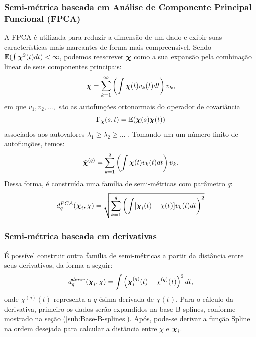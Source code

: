 \documentclass[
	12pt,				%
	openright,			%
	oneside,			%
	a4paper,			%
	english,			%
	brazil				%
	]{dissertacao-ufrgs-abntex2}
\begin{document}
\subsubsection*{Semi-métrica baseada em Análise de Componente Principal Funcional
(FPCA)}

A FPCA é utilizada para reduzir a dimensão de um dado e exibir suas
características mais marcantes de forma mais compreensível. Sendo
$\mathbb{E}(\int\boldsymbol{\chi}^{2}(t)dt)<\infty$, podemos reescrever $\boldsymbol{\chi}$
como a sua expansão pela combinação linear de seus componentes principais:
\begin{equation}
\boldsymbol{\chi}=\sum_{k=1}^{\text{\ensuremath{\infty}}}\left(\int\boldsymbol{\chi}(t)v_{k}(t)dt\right)v_{k},
\end{equation}
em que $v_{1},v_{2},...,$ são as autofunções ortonormais do operador de covariância
\begin{equation}
\Gamma_{\boldsymbol{\chi}}(s,t)=\mathbb{E}(\boldsymbol{\chi}(s)\boldsymbol{\chi}(t))
\end{equation}
associados aos autovalores $\lambda_{1}\geq\lambda_{2}\geq...$ .
Tomando um um número finito de autofunções, temos:
\begin{equation}
\tilde{\boldsymbol{\chi}}^{(q)}=\sum_{k=1}^{\text{\ensuremath{q}}}\left(\int\boldsymbol{\chi}(t)v_{k}(t)dt\right)v_{k}.
\end{equation}
Dessa forma, é construída uma família de semi-métricas com parâmetro
$q$:
\begin{equation}
d_{q}^{PCA}(\boldsymbol{\chi}_{i},\chi)=\sqrt{\sum_{k=1}^{\text{\ensuremath{q}}}\left(\int[\boldsymbol{\chi}_{i}(t)-\chi(t)]v_{k}(t)dt\right)^{2}}
\end{equation}



\subsubsection*{Semi-métrica baseada em derivativas}

É possível construir outra família de semi-métricas a partir da distância
entre seus derivativos, da forma a seguir:
\begin{equation}
d_{q}^{deriv}(\boldsymbol{\chi}_{i},\chi)=\int\left(\boldsymbol{\chi}_{i}^{(q)}(t)-\chi^{(q)}(t)\right)^{2}dt,
\end{equation}
onde $\chi^{(q)}(t)$ representa a $q$-ésima derivada de $\chi(t)$.
Para o cálculo da derivativa, primeiro os dados serão expandidos na
base B-splines, conforme mostrado na seção (\ref{sub:Base-B-splines}).
Após, pode-se derivar a função Spline na ordem desejada para calcular
a distância entre $\chi$ e $\boldsymbol{\chi}_{i}$.
\end{document}
